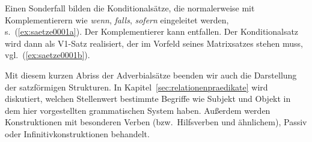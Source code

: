 
Einen Sonderfall bilden die Konditionalsätze, die normalerweise mit Komplementierern wie \textit{wenn}, \textit{falls}, \textit{sofern} eingeleitet werden, s.\ (\ref{ex:saetze0001a}).
Der Komplementierer kann entfallen.
Der Konditionalsatz wird dann als V1-Satz realisiert, der im Vorfeld seines Matrixsatzes stehen muss, vgl.\ (\ref{ex:saetze0001b}).

\begin{exe}
  \ex\label{ex:saetze0001}
  \begin{xlist}
  \end{xlist}
\end{exe}

Mit diesem kurzen Abriss der Adverbialsätze beenden wir auch die Darstellung der satzförmigen Strukturen.
In Kapitel~\ref{sec:relationenpraedikate} wird diskutiert, welchen Stellenwert bestimmte Begriffe wie Subjekt und Objekt in dem hier vorgestellten grammatischen System haben.
Außerdem werden Konstruktionen mit besonderen Verben (bzw.\ Hilfsverben und ähnlichem), \zB Passiv oder Infinitivkonstruktionen behandelt.

\Zusammenfassung

